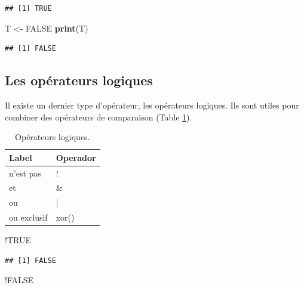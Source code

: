 \documentclass[twoside,symmetric]{book}
\newenvironment{Shaded}{}{}
\newcommand{\KeywordTok}[1]{\textbf{#1}}
\newcommand{\NormalTok}[1]{#1}
\newcommand{\OperatorTok}[1]{#1}
\newcommand{\OtherTok}[1]{#1}
\newcommand{\StringTok}[1]{#1}
\begin{document}
\begin{verbatim}
## [1] TRUE
\end{verbatim}

\begin{Shaded}
\begin{Highlighting}[]
\NormalTok{T <-}\StringTok{ }\OtherTok{FALSE}
\KeywordTok{print}\NormalTok{(T)}
\end{Highlighting}
\end{Shaded}

\begin{verbatim}
## [1] FALSE
\end{verbatim}

\hypertarget{l011oplog}{%
\subsection{Les opérateurs logiques}\label{l011oplog}}

Il existe un dernier type d'opérateur, les opérateurs logiques. Ils sont utiles pour combiner des opérateurs de comparaison (Table \ref{tab:tabOpLog}).

\begin{table}

\caption{\label{tab:tabOpLog}Opérateurs logiques.\label{tab:tabOpLog}}
\centering
\begin{tabular}[t]{l|l}
\hline
Label & Operador\\
\hline
n'est pas & !\\
\hline
et & \&\\
\hline
ou & |\\
\hline
ou exclusif & xor()\\
\hline
\end{tabular}
\end{table}

\begin{Shaded}
\begin{Highlighting}[]
\OperatorTok{!}\OtherTok{TRUE}
\end{Highlighting}
\end{Shaded}

\begin{verbatim}
## [1] FALSE
\end{verbatim}

\begin{Shaded}
\begin{Highlighting}[]
\OperatorTok{!}\OtherTok{FALSE}
\end{Highlighting}
\end{Shaded}
\end{document}
